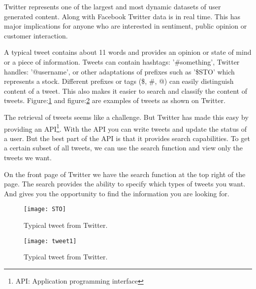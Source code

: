 Twitter represents one of the largest and most dynamic datasets of user
generated content. Along with Facebook Twitter data is in real time. This has major
implications for anyone who are interested in sentiment, public opinion or
customer interaction. \cite[]{sperious11}

A typical tweet contains about 11 words and provides an opinion or state of
mind or a piece of information. Tweets can contain hashtags: '\#something',
Twitter handles:
'@username', or other adaptations of prefixes such as '\$STO' which represents a
stock. Different prefixes or tags (\$, \#, @) can easily distinguish
content of a tweet. This also makes it easier to search and classify the
content of tweets. Figure:\ref{fig:sto} and figure:\ref{fig:tweet1} are
examples of tweets as shown on Twitter.

The retrieval of tweets seems like a challenge. But Twitter has made this easy
by providing an API\footnote{API: Application programming interface}. With the
API you can write tweets and update the status of a user. But the best part of
the API is that it provides search capabilities. To get a certain subset of all
tweets, we can use the search function and view only the tweets we want. 

On the front page of Twitter we have the search function at the top right of
the page. The search provides the ability to specify which types of tweets you
want. And gives you the opportunity to find the information you are looking for. 

\begin{figure}[htb]
    \centering
    \texttt{[image: STO]} 
    \caption{Typical tweet from Twitter.}
    \label{fig:sto}
\end{figure}


\begin{figure}[htb]
    \centering
    \texttt{[image: tweet1]} 
    \caption{Typical tweet from Twitter.}
    \label{fig:tweet1}
\end{figure}

%

